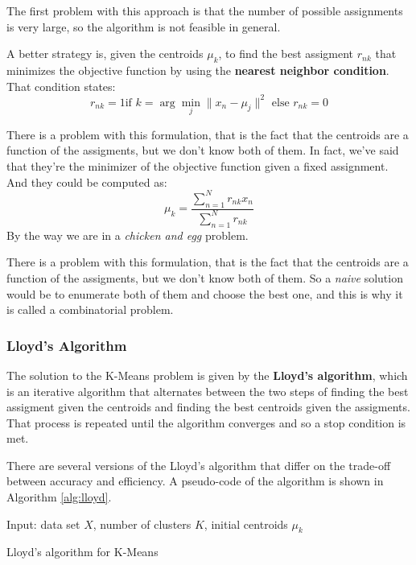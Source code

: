 The first problem with this approach is that the number of possible assignments is very large, so the algorithm is not feasible in general. 

A better strategy is, given the centroids $\mu_k$, to find the best assigment $r_{nk}$ that minimizes the objective function by using the \textbf{nearest neighbor condition}. That condition states:
\[
    r_{nk} = 1 \text{if } k = \arg\min_{j} \|x_n - \mu_j\|^2 \text{ else } r_{nk} = 0 
\]

There is a problem with this formulation, that is the fact that the centroids are a function of the assigments, but we don't know both of them.
In fact, we've said that they're the minimizer of the objective function given a fixed assignment. And they could be computed as:
\[
    \mu_k = \frac{\sum_{n=1}^{N} r_{nk} x_n}{\sum_{n=1}^{N} r_{nk}}
\]
By the way we are in a \textit{chicken and egg} problem.

There is a problem with this formulation, that is the fact that the centroids are a function of the assigments, but we don't know both of them. So a \textit{naive} solution would be to enumerate both of them and choose the best one, and this is why it is called a combinatorial problem.


\subsubsection*{Lloyd's Algorithm}

The solution to the K-Means problem is given by the \textbf{Lloyd's algorithm}, which is an iterative algorithm that alternates between the two steps of finding the best assigment given the centroids and finding the best centroids given the assigments.
That process is repeated until the algorithm converges and so a stop condition is met.

There are several versions of the Lloyd's algorithm that differ on the trade-off between accuracy and efficiency. A pseudo-code of the algorithm is shown in Algorithm \ref{alg:lloyd}.

\begin{algorithm}
    \SetAlgoLined
    Input: data set $X$, number of clusters $K$, initial centroids $\mu_k$ \\
    \caption{Lloyd's algorithm for K-Means}
    \label{alg:lloyd}
\end{algorithm}

